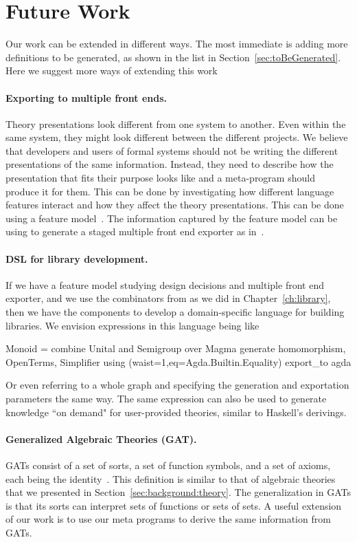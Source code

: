 \section*{Future Work}
\label{future_work}
Our work can be extended in different ways. The most immediate is adding more definitions to be generated, as shown in the list in Section~\ref{sec:toBeGenerated}. Here we suggest more ways of extending this work 

\paragraph{Exporting to multiple front ends.} Theory presentations look different from one system to another. Even within the same system, they might look different between the different projects. We believe that developers and users of formal systems should not be writing the different presentations of the same information. Instead, they need to describe how the presentation that fits their purpose looks like and a meta-program should produce it for them. This can be done by investigating how different language features interact and how they affect the theory presentations. This can be done using a feature model~\cite{czarnecki2000generative}. The information captured by the feature model can be using to generate a staged multiple front end exporter as in~\cite{stagedConfig}. 

\paragraph{DSL for library development.}
If we have a feature model studying design decisions and multiple front end exporter, and we use the combinators from \cite{carette2018building} as we did in Chapter~\ref{ch:library}, then we have the components to develop a domain-specific language for building libraries. We envision expressions in this language being like
\begin{togcode}
Monoid = combine Unital and Semigroup over Magma
         generate homomorphism, OpenTerms, Simplifier
         using (waist=1,eq=Agda.Builtin.Equality)
         export_to agda 
\end{togcode} 
Or even referring to a whole graph and specifying the generation and exportation parameters the same way. 
The same expression can also be used to generate knowledge ``on demand" for user-provided theories, similar to Haskell's derivings. 

\paragraph{Generalized Algebraic Theories (GAT).}
GATs consist of a set of sorts, a set of function symbols, and a set of axioms, each being the identity~\cite{cartmell1986gats}. This definition is similar to that of algebraic theories that we presented in Section~\ref{sec:background:theory}. The generalization in GATs is that its sorts can interpret sets of functions or sets of sets. A useful extension of our work is to use our meta programs to derive the same information from GATs. 

